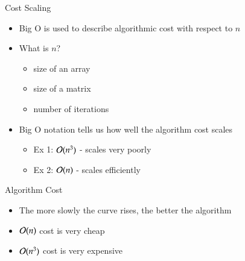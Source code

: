 \documentclass[10pt]{beamer}
\begin{document}
\begin{frame}{Cost Scaling}

\begin{itemize}
    \item Big O is used to describe algorithmic cost with respect to $n$
    \item What is $n$?
    \begin{itemize}
        \item size of an array
        \item size of a matrix 
        \item number of iterations 
    \end{itemize}
    \item Big O notation tells us how well the algorithm cost scales
    \begin{itemize}
        \item Ex 1: ${\mathcal{O}}(n^3)$ - scales very poorly 
        \item Ex 2: ${\mathcal{O}}( n)$ - scales efficiently
    \end{itemize}
\end{itemize}


\end{frame}


\begin{frame}{Algorithm Cost}
\begin{center}
\end{center}
\begin{itemize}
    \item The more slowly the curve rises, the better the algorithm
    \item ${\mathcal{O}}(n)$ cost is very cheap
    \item ${\mathcal{O}}(n^3)$ cost is very expensive
\end{itemize}
\end{frame}
\end{document}
